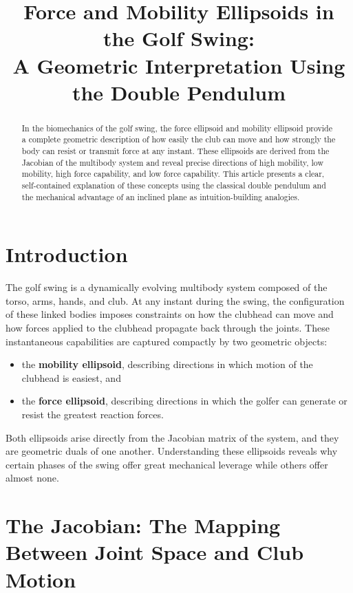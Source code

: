\documentclass[12pt]{article}
\title{Force and Mobility Ellipsoids in the Golf Swing:\\
A Geometric Interpretation Using the Double Pendulum}
\author{}
\date{}
\begin{document}
\maketitle

\begin{abstract}
In the biomechanics of the golf swing, the force ellipsoid and mobility ellipsoid 
provide a complete geometric description of how easily the club can move and how 
strongly the body can resist or transmit force at any instant.  
These ellipsoids are derived from the Jacobian of the multibody system and reveal 
precise directions of high mobility, low mobility, high force capability, and low 
force capability.  
This article presents a clear, self-contained explanation of these concepts using 
the classical double pendulum and the mechanical advantage of an inclined plane 
as intuition-building analogies.
\end{abstract}

\section{Introduction}

The golf swing is a dynamically evolving multibody system composed of the torso, 
arms, hands, and club.  
At any instant during the swing, the configuration of these linked bodies imposes 
constraints on how the clubhead can move and how forces applied to the clubhead 
propagate back through the joints.  
These instantaneous capabilities are captured compactly by two geometric objects:

\begin{itemize}
    \item the \textbf{mobility ellipsoid}, describing directions in which motion 
    of the clubhead is easiest, and
    \item the \textbf{force ellipsoid}, describing directions in which the golfer 
    can generate or resist the greatest reaction forces.
\end{itemize}

Both ellipsoids arise directly from the Jacobian matrix of the system, and they 
are geometric duals of one another.  
Understanding these ellipsoids reveals why certain phases of the swing offer great 
mechanical leverage while others offer almost none.

\section{The Jacobian: The Mapping Between Joint Space and Club Motion}
\end{document}
